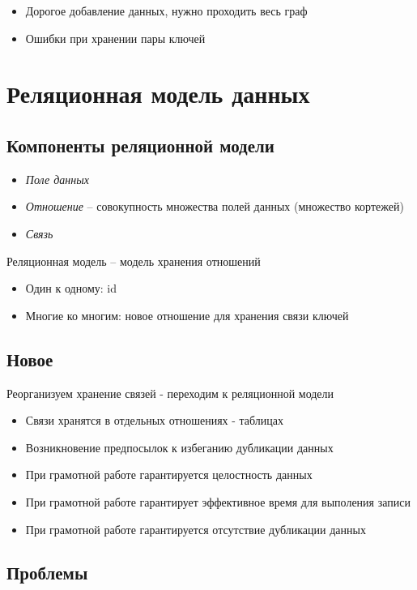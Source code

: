 \documentclass[12pt, a4paper]{article}
\begin{document}
\begin{itemize}
    \item Дорогое добавление данных, нужно проходить весь граф
    \item Ошибки при хранении пары ключей
\end{itemize}

\section{Реляционная модель данных}

\subsection{Компоненты реляционной модели}

\begin{itemize}
    \item \emph{Поле данных}
    \item \emph{Отношение} -- совокупность множества полей данных (множество кортежей)
    \item \emph{Связь}
\end{itemize}

Реляционная модель -- модель хранения отношений
\begin{itemize}
    \item Один к одному: id
    \item Многие ко многим: новое отношение для хранения связи ключей
\end{itemize}

\subsection{Новое}
Реорганизуем хранение связей - переходим к реляционной модели
\begin{itemize}
    \item Связи хранятся в отдельных отношениях - таблицах
    \item Возникновение предпосылок к избеганию дубликации данных
    \item При грамотной работе гарантируется целостность данных
    \item При грамотной работе гарантирует эффективное время для  выполения записи
    \item При грамотной работе гарантируется отсутствие дубликации данных
\end{itemize}

\subsection{Проблемы}
\end{document}
